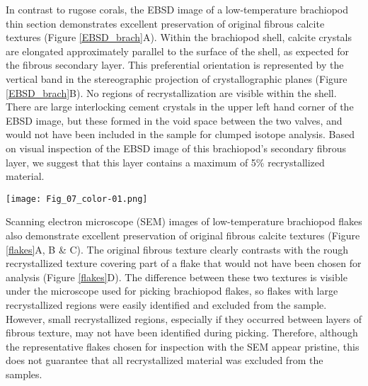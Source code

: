 \documentclass[5p, authoryear]{elsarticle}
\newcommand{\degrees}{$^{\circ}$}
\begin{document}
In contrast to rugose corals, the EBSD image of a low-temperature brachiopod thin section demonstrates excellent preservation of original fibrous calcite textures (Figure \ref{EBSD_brach}A). Within the brachiopod shell, calcite crystals are elongated approximately parallel to the surface of the shell, as expected for the fibrous secondary layer. This preferential orientation is represented by the vertical band in the stereographic projection of crystallographic planes (Figure \ref{EBSD_brach}B). No regions of recrystallization are visible within the shell. There are large interlocking cement crystals in the upper left hand corner of the EBSD image, but these formed in the void space between the two valves, and would not have been included in the sample for clumped isotope analysis. Based on visual inspection of the EBSD image of this brachiopod's secondary fibrous layer, we suggest that this layer contains a maximum of 5\% recrystallized material. 

\begin{figure*}[tb]
\centering
\texttt{[image: Fig\_07\_color-01.png]}
\caption{Calcite fabric in a brachiopod. A) Transmitted polarized light image of a thin section of brachiopod G3 LVF B1. This sample has a clumped isotope temperature of 35\degrees C. The boxed overlay is an electron backscatter diffraction (EBSD) image of the same sample. The orientation of calcite crystals is indicated by different shades. B) Euler pole figure generated from the EBSD analysis. The central band represents the preferential orientation of calcite crystals parallel to the outer surface of the brachiopod shell.}
\label{EBSD_brach}
\end{figure*}

Scanning electron microscope (SEM) images of low-temperature brachiopod flakes also demonstrate excellent preservation of original fibrous calcite textures (Figure \ref{flakes}A, B \& C). The original fibrous texture clearly contrasts with the rough recrystallized texture covering part of a flake that would not have been chosen for analysis (Figure \ref{flakes}D). The difference between these two textures is visible under the microscope used for picking brachiopod flakes, so flakes with large recrystallized regions were easily identified and excluded from the sample. However, small recrystallized regions, especially if they occurred between layers of fibrous texture, may not have been identified during picking. Therefore, although the representative flakes chosen for inspection with the SEM appear pristine, this does not guarantee that all recrystallized material was excluded from the samples.
\end{document}
